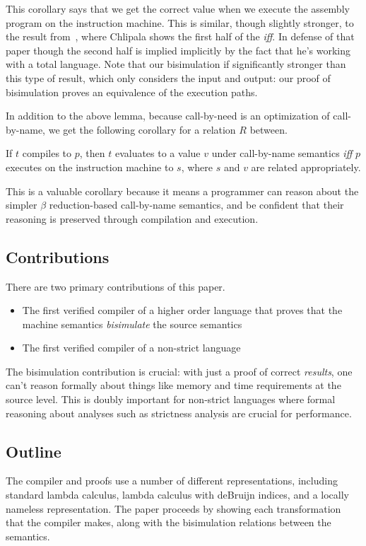 This corollary says that we get the correct value when we execute the assembly
program on the instruction machine. This is similar, though slightly stronger,
to the result from~\cite{chlipala2007certified}, where Chlipala shows the first
half of the \emph{iff}. In defense of that paper though the second half is
implied implicitly by the fact that he's working with a total language. Note
that our bisimulation if significantly stronger than this type of result, which
only considers the input and output: our proof of bisimulation proves an
equivalence of the execution paths.

In addition to the above lemma, because call-by-need is an optimization of
call-by-name, we get the following corollary for a relation $R$ between.

\begin{corollary}
If $t$ compiles to $p$, then $t$ evaluates to a value $v$ under call-by-name
semantics \emph{iff} $p$ executes on the instruction machine to $s$, where $s$
and $v$ are related appropriately.
\end{corollary}

This is a valuable corollary because it means a programmer can reason about the
simpler $\beta$ reduction-based call-by-name semantics, and be confident that
their reasoning is preserved through compilation and execution.

\subsection{Contributions}
There are two primary contributions of this paper. 
\begin{itemize}
\item The first verified compiler of a higher order language that proves that
the machine semantics \emph{bisimulate} the source semantics
\item The first verified compiler of a non-strict language
\end{itemize}

The bisimulation contribution is crucial: with just a proof of correct
\emph{results}, one can't reason formally about things like memory and time
requirements at the source level. This is doubly important for non-strict
languages where formal reasoning about analyses such as strictness analysis
are crucial for performance.

\subsection{Outline}
The compiler and proofs use a number of different representations, including
standard lambda calculus, lambda calculus with deBruijn indices, and a locally
nameless representation. The paper proceeds by showing each transformation that
the compiler makes, along with the bisimulation relations between the semantics.

